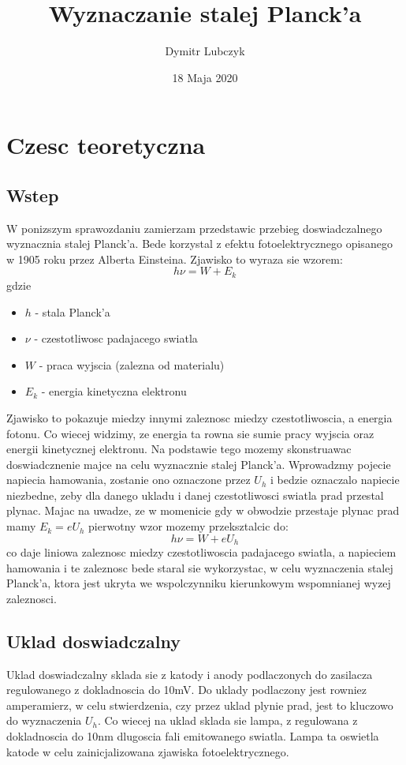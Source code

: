 \documentclass{article}
\title{Wyznaczanie stalej Planck'a}
\author{Dymitr Lubczyk }
\date{18 Maja 2020}
\begin{document}
\maketitle
\clearpage
\section{Czesc teoretyczna}
\subsection{Wstep}
W ponizszym sprawozdaniu zamierzam przedstawic przebieg doswiadczalnego wyznacznia stalej Planck'a. Bede korzystal z efektu fotoelektrycznego opisanego w 1905 roku przez Alberta Einsteina. Zjawisko to wyraza sie wzorem:
\[ h\nu = W+E_{k} \]
gdzie 

\begin{itemize}
  \item \(h\) - stala Planck'a
  \item \(\nu\) - czestotliwosc padajacego swiatla
  \item \(W\) - praca wyjscia (zalezna od materialu) 
  \item \(E_{k}\) - energia kinetyczna elektronu  
\end{itemize}
Zjawisko to pokazuje miedzy innymi zaleznosc miedzy czestotliwoscia, a energia fotonu. Co wiecej widzimy, ze energia ta rowna sie sumie pracy wyjscia oraz energii kinetycznej elektronu. Na podstawie tego mozemy skonstruawac doswiadcznenie majce na celu wyznacznie stalej Planck'a.
Wprowadzmy pojecie napiecia hamowania, zostanie ono oznaczone przez \(U_{h}\) i bedzie oznaczalo napiecie niezbedne, zeby dla danego ukladu i danej czestotliwosci swiatla prad przestal plynac. Majac na uwadze, ze w momenicie gdy w obwodzie przestaje plynac prad mamy \(E_{k}=eU_{h}\) pierwotny wzor mozemy przeksztalcic do:
\[ h\nu = W+eU_{h} \]
co daje liniowa zaleznosc miedzy czestotliwoscia padajacego swiatla, a napieciem hamowania i te zaleznosc bede staral sie wykorzystac, w celu wyznaczenia stalej Planck'a, ktora jest ukryta we wspolczynniku kierunkowym wspomnianej wyzej zaleznosci.
\subsection{Uklad doswiadczalny}
Uklad doswiadczalny sklada sie z katody i anody podlaczonych do zasilacza regulowanego z dokladnoscia do 10mV. Do uklady podlaczony jest rowniez amperamierz, w celu stwierdzenia, czy przez uklad plynie prad, jest to kluczowo do wyznaczenia \(U_{h}\). Co wiecej na uklad sklada sie lampa, z regulowana z dokladnoscia do 10nm dlugoscia fali emitowanego swiatla. Lampa ta oswietla katode w celu zainicjalizowana zjawiska fotoelektrycznego.
\clearpage
\end{document}
